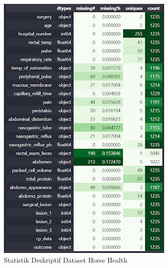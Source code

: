 \documentclass[conference]{IEEEtran}
\begin{document}
\begin{figure}[htbp]
    \centerline{\includegraphics[width=\linewidth, scale=0.5]{horse_feature_description.png}}
    \caption{Statistik Deskriptif Dataset Horse Health}
    \label{horse_description}
\end{figure}
\end{document}
